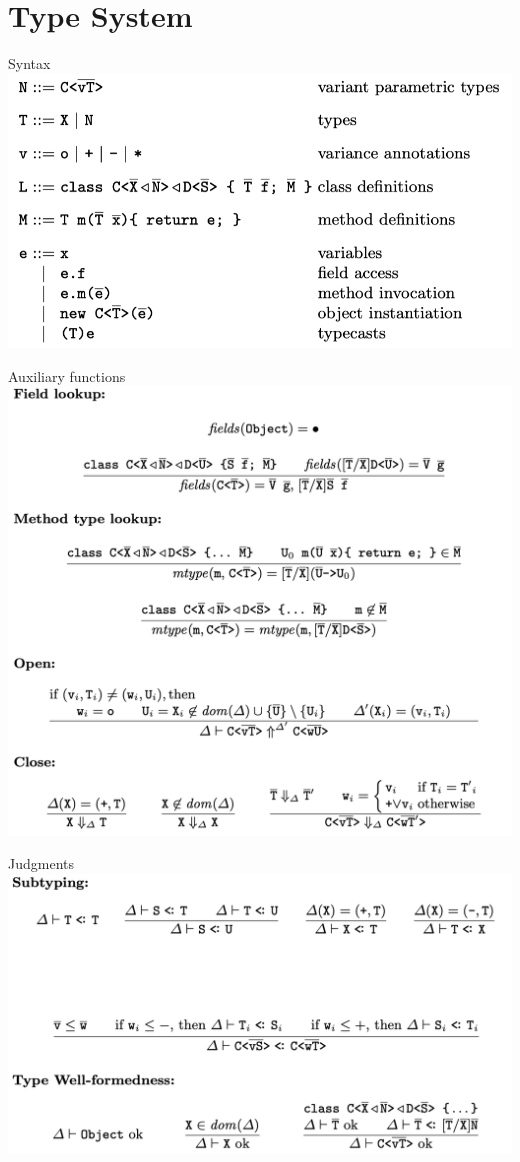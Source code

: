 \documentclass[usenames,dvipsnames]{beamer}
\begin{document}
\section{Type System}
\begin{frame}{Syntax}
\includegraphics[scale=0.28]{img/syntax}
\end{frame}
\begin{frame}{Auxiliary functions}
\centering
\includegraphics[scale=0.20]{img/type1}
\end{frame}
\begin{frame}{Judgments}
\centering
\includegraphics[scale=0.25]{img/type2}
\end{frame}
\end{document}
